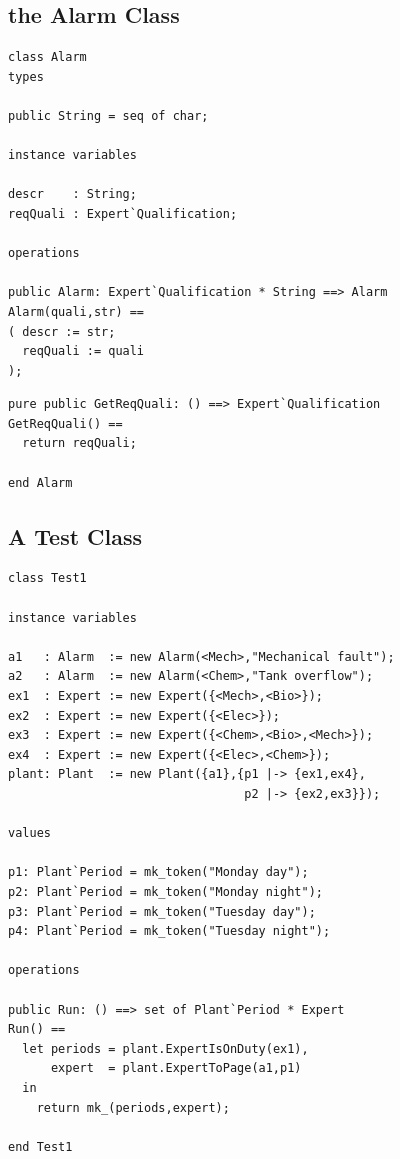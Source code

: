 \subsection{the Alarm Class}

\begin{lstlisting}
class Alarm
types

public String = seq of char;

instance variables

descr    : String;
reqQuali : Expert`Qualification;

operations

public Alarm: Expert`Qualification * String ==> Alarm
Alarm(quali,str) ==
( descr := str;
  reqQuali := quali
);
\end{lstlisting}

\begin{lstlisting}
pure public GetReqQuali: () ==> Expert`Qualification
GetReqQuali() ==
  return reqQuali;

end Alarm
\end{lstlisting}

\subsection{A Test Class}

\begin{lstlisting}
class Test1

instance variables

a1   : Alarm  := new Alarm(<Mech>,"Mechanical fault");
a2   : Alarm  := new Alarm(<Chem>,"Tank overflow");
ex1  : Expert := new Expert({<Mech>,<Bio>});
ex2  : Expert := new Expert({<Elec>});
ex3  : Expert := new Expert({<Chem>,<Bio>,<Mech>});
ex4  : Expert := new Expert({<Elec>,<Chem>});
plant: Plant  := new Plant({a1},{p1 |-> {ex1,ex4},
                                 p2 |-> {ex2,ex3}});

values

p1: Plant`Period = mk_token("Monday day");
p2: Plant`Period = mk_token("Monday night");
p3: Plant`Period = mk_token("Tuesday day");
p4: Plant`Period = mk_token("Tuesday night");

operations

public Run: () ==> set of Plant`Period * Expert
Run() ==
  let periods = plant.ExpertIsOnDuty(ex1),
      expert  = plant.ExpertToPage(a1,p1)
  in
    return mk_(periods,expert);

end Test1
\end{lstlisting}



